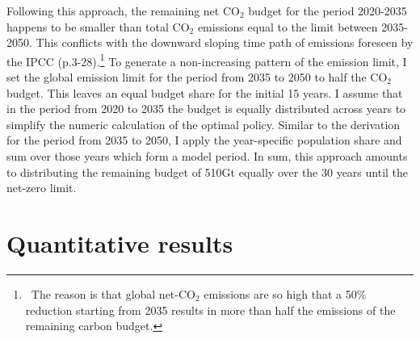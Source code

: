 Following this approach, the remaining net CO$_2$ budget for the period 2020-2035 happens to be smaller than total CO$_2$ emissions equal to the limit between 2035-2050. This conflicts with the downward sloping time path of emissions foreseen by the IPCC (p.3-28).\footnote{\ The reason is that global net-CO$_2$ emissions are so high that a 50\% reduction starting from 2035 results in more than half the emissions of the remaining carbon budget.}
To generate a non-increasing pattern of the emission limit, I set the global emission limit for the period from 2035 to 2050 to half the CO$_2$ budget. This leaves an equal budget share for the initial 15 years. I assume that in the period from 2020 to 2035 the budget is equally distributed across years to simplify the numeric calculation of the optimal policy. Similar to the derivation for the period from 2035 to 2050, I apply the year-specific population share and sum over those years which form a model period. In sum, this approach amounts to distributing the remaining budget of 510Gt equally over the 30 years until the net-zero limit.

\section{Quantitative results}\label{app:quant_res}



